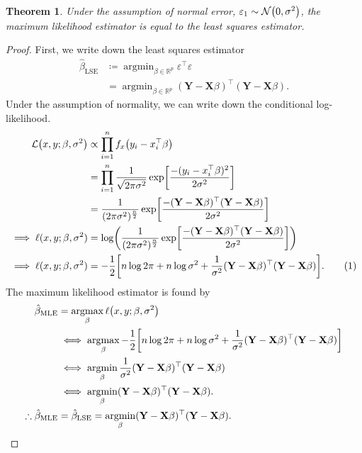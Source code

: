 \documentclass[letterpaper, reqno]{amsart}
\newtheorem{theorem}{Theorem}[section]
\numberwithin{equation}{section}
\newcommand{\numberthis}{\addtocounter{equation}{1}\tag{\theequation}}
\newcommand{\T}{\top} %
\newcommand{\vect}[1]{\boldsymbol{\mathbf{#1}}} %
\newcommand{\Li}[1]{\mathcal{L}\mleft( #1 \mright)}  %
\newcommand{\R}{\mathbb{R}}  %
\newcommand{\N}[2]{\mathcal{N}\mleft( #1, #2 \mright)}
\newcommand{\Xm}{\vect{X}}
\newcommand{\Yv}{\vect{Y}}
\newcommand{\Bv}{\beta}
\newcommand{\Bvh}{\hat{\beta}}
\newcommand{\ve}{\varepsilon}
\DeclareMathOperator*{\argmin}{argmin}
\DeclareMathOperator*{\argmax}{argmax}
\begin{document}
\begin{theorem}
  Under the assumption of normal error, $\ve_1 \sim \N{0}{\sigma^2}$, the maximum
  likelihood estimator is equal to the least squares estimator.
\end{theorem}

\begin{proof}
  First, we write down the least squares estimator
  \begin{align*}
    \Bvh_\mathrm{LSE} &\coloneqq \argmin_{\Bv \in \R^p} \ve^\T \ve \\
                      &= \argmin_{\Bv \in \R^p} (\Yv - \Xm\Bv)^\T (\Yv - \Xm\Bv).
  \end{align*}
  Under the assumption of normality, we can write down the conditional log-likelihood.
  \begin{align*}
    \Li{x, y; \Bv, \sigma^2} &\propto \prod_{i=1}^n f_x\mleft(y_i - x_i^\T\Bv\mright) \\
    &= \prod_{i=1}^n \frac{1}{\sqrt{2\pi\sigma^2}} 
       \exp \mleft[\frac{-(y_i - x_i^\T\Bv)^2}{2\sigma^2}\mright] \\
    &= \frac{1}{(2\pi\sigma^2)^\frac{n}{2}} 
       \exp \mleft[\frac{-(\Yv - \Xm\Bv)^\T(\Yv - \Xm\Bv)}{2\sigma^2}\mright] \\
    \implies \ell(x, y; \Bv, \sigma^2) &= \log\mleft( \frac{1}{(2\pi\sigma^2)^\frac{n}{2}} 
       \exp \mleft[\frac{-(\Yv - \Xm\Bv)^\T(\Yv - \Xm\Bv)}{2\sigma^2}\mright]
       \mright) \\
    \implies \ell(x, y; \Bv, \sigma^2) &= -\frac{1}{2}\mleft[ n\log 2\pi + n \log\sigma^2 
          + \frac{1}{\sigma^2} (\Yv - \Xm\Bv)^\T(\Yv - \Xm\Bv) \mright]. \numberthis \label{eq:likelihood}
  \end{align*}
  The maximum likelihood estimator is found by
  \begin{align*}
    \Bvh_\mathrm{MLE} &= \argmax_\Bv \ell\mleft(x, y; \Bv, \sigma^2\mright) \\
    &\iff \argmax_\Bv -\frac{1}{2}\mleft[ n\log 2\pi + n\log\sigma^2 
          + \frac{1}{\sigma^2} (\Yv - \Xm\Bv)^\T(\Yv - \Xm\Bv) \mright] \\
    &\iff \argmin_\Bv \frac{1}{\sigma^2} (\Yv - \Xm\Bv)^\T(\Yv - \Xm\Bv) \\
    &\iff \argmin_\Bv (\Yv - \Xm\Bv)^\T(\Yv - \Xm\Bv). \\
    \therefore \Bvh_\mathrm{MLE} &= \Bvh_\mathrm{LSE} = \argmin_\Bv (\Yv - \Xm\Bv)^\T(\Yv - \Xm\Bv). \qedhere
  \end{align*}
\end{proof}
\end{document}

